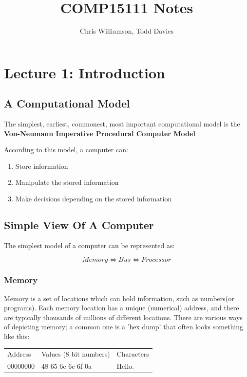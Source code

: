 \documentclass{article}
\begin{document}
\author{Chris Williamson, Todd Davies}
\title{COMP15111 Notes}

\maketitle
\tableofcontents
\newpage

\section{Lecture 1: Introduction}
\subsection{A Computational Model}
The simplest, earliest, commonest, most important computational model is the \textbf{Von-Neumann Imperative Procedural Computer Model}

According to this model, a computer can:
\begin{enumerate}
	\item Store information
	\item Manipulate the stored information
	\item Make decisions depending on the stored information
\end{enumerate}

\subsection{Simple View Of A Computer}
The simplest model of a computer can be represented as:

\[
	Memory \Leftrightarrow Bus \Leftrightarrow Processor
\]

\subsubsection{Memory}
Memory is a set of locations which can hold information, such as numbers(or programs). Each memory location has a unique (numerical) address, and there are typically thousands of millions of different locations. There are various ways of depicting memory; a common one is a 'hex dump' that often looks something like this: 

\begin{tabular}{l l l}
	Address     &	Values (8 bit numbers)	&	Characters\\
	00000000	&	48 65 6c 6c 6f 0a		&	Hello.\\
\end{tabular}
\end{document}
